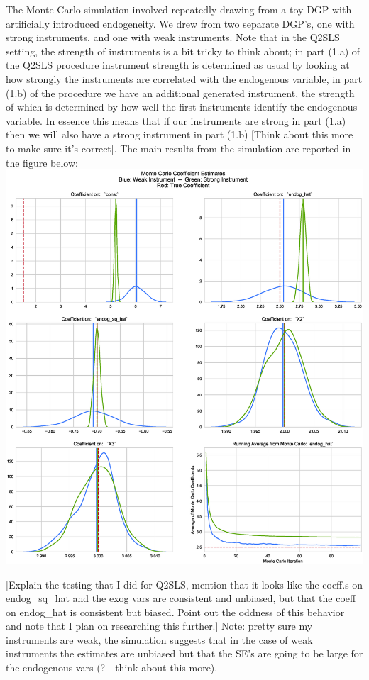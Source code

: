 \documentclass[12pt]{article}
\begin{document}
The Monte Carlo simulation involved repeatedly drawing from a toy DGP with artificially introduced endogeneity. We drew from two separate DGP's, one with strong instruments, and one with weak instruments. Note that in the Q2SLS setting, the strength of instruments is a bit tricky to think about; in part (1.a) of the Q2SLS procedure instrument strength is determined as usual by looking at how strongly the instruments are correlated with the endogenous variable, in part (1.b) of the procedure we have an additional generated instrument, the strength of which is determined by how well the first instruments identify the endogenous variable. In essence this means that if our instruments are strong in part (1.a) then we will also have a strong instrument in part (1.b) \textcolor{BrickRed}{[Think about this more to make sure it's correct]}. The main results from the simulation are reported in the figure below:
\includegraphics[width=1\linewidth]{figures/MC_strong_and_weak.eps}





\textcolor{BrickRed}{[Explain the testing that I did for Q2SLS, mention that it looks like the coeff.s on endog\_sq\_hat and the exog vars are consistent and unbiased, but that the coeff on endog\_hat is consistent but biased. Point out the oddness of this behavior and note that I plan on researching this further.]} Note: pretty sure my instruments are weak, the simulation suggests that in the case of weak instruments the estimates are unbiased but that the SE's are going to be large for the endogenous vars (? - think about this more).
\end{document}
